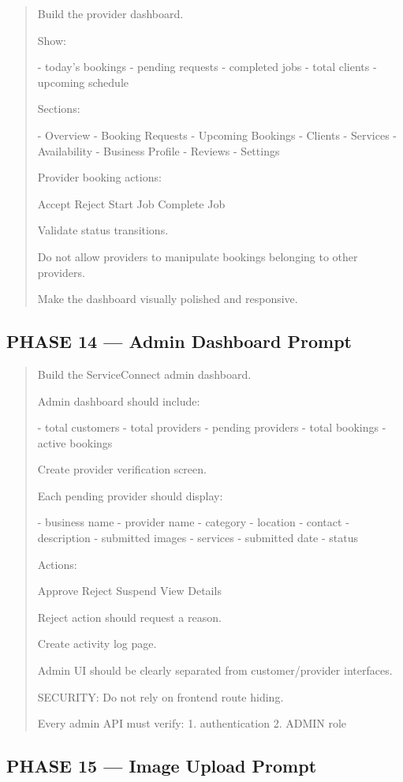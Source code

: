 \begin{quote}
Build the provider dashboard.

Show:

- today's bookings
- pending requests
- completed jobs
- total clients
- upcoming schedule

Sections:

- Overview
- Booking Requests
- Upcoming Bookings
- Clients
- Services
- Availability
- Business Profile
- Reviews
- Settings

Provider booking actions:

Accept
Reject
Start Job
Complete Job

Validate status transitions.

Do not allow providers to manipulate bookings belonging to other providers.

Make the dashboard visually polished and responsive.
\end{quote}

\subsection*{PHASE 14 --- Admin Dashboard Prompt}

\begin{quote}
Build the ServiceConnect admin dashboard.

Admin dashboard should include:

- total customers
- total providers
- pending providers
- total bookings
- active bookings

Create provider verification screen.

Each pending provider should display:

- business name
- provider name
- category
- location
- contact
- description
- submitted images
- services
- submitted date
- status

Actions:

Approve
Reject
Suspend
View Details

Reject action should request a reason.

Create activity log page.

Admin UI should be clearly separated from customer/provider interfaces.

SECURITY:
Do not rely on frontend route hiding.

Every admin API must verify:
1. authentication
2. ADMIN role
\end{quote}

\subsection*{PHASE 15 --- Image Upload Prompt}

